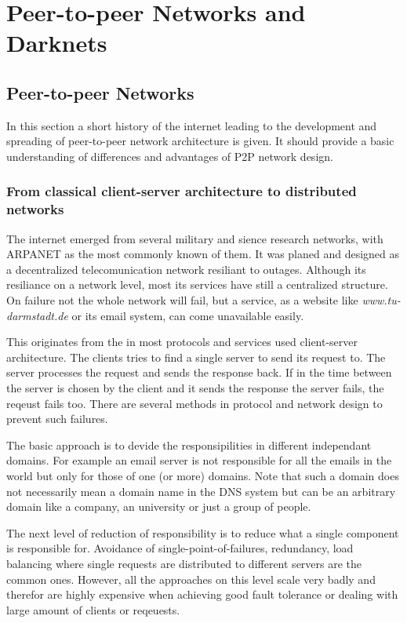 \chapter{Peer-to-peer Networks and Darknets}


\section{Peer-to-peer Networks}
In this section a short history of the internet leading to the development and spreading of peer-to-peer network architecture is given. It should provide a basic understanding of differences and advantages of P2P network design.

\subsection{From classical client-server architecture to distributed networks}
The internet emerged from several military and sience research networks, with ARPANET as the most commonly known of them. It was planed and designed as a decentralized telecomunication network resiliant to outages. Although its resiliance on a network level, most its services have still a centralized structure. On failure not the whole network will fail, but a service, as a website like \emph{www.tu-darmstadt.de} or its email system, can come unavailable easily.

This originates from the in most protocols and services used client-server architecture. The clients tries to find a single server to send its request to. The server processes the request and sends the response back. If in the time between the server is chosen by the client and it sends the response the server fails, the reqeust fails too. There are several methods in protocol and network design to prevent such failures.

The basic approach is to devide the responsipilities in different independant domains. For example an email server is not responsible for all the emails in the world but only for those of one (or more) domains. Note that such a domain does not necessarily mean a domain name in the DNS system but can be an arbitrary domain like a company, an university or just a group of people.

The next level of reduction of responsibility is to reduce what a single component is responsible for. Avoidance of single-point-of-failures, redundancy, load balancing where single requests are distributed to different servers are the common ones. However, all the approaches on this level scale very badly and therefor are highly expensive when achieving good fault tolerance or dealing with large amount of clients or reqeuests.


